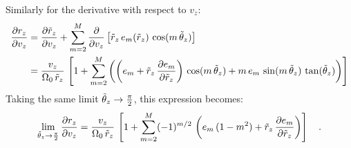 Similarly for the derivative with respect to $v_z$:
\begin{align}
    \frac{\partial r_z}{\partial v_z} &=
        \frac{\partial \tilde{r}_z}{\partial v_z} +
        \sum_{m=2}^{M} \frac{\partial}{\partial v_z}
            \left[\tilde{r}_z \, e_m(\tilde{r}_z) \, \cos(m \, \tilde{\theta}_z)\right]\\
    &= \frac{v_z}{\Omega_0 \, \tilde{r}_z} \, \left[
        1 + \sum_{m=2}^{M} \left(
            \left(e_m + \tilde{r}_z \, \frac{\partial e_m}{\partial \tilde{r}_z}\right) \,
                \cos(m \, \tilde{\theta}_z) +
            m \, e_m \, \sin(m \, \tilde{\theta}_z) \, \tan(\tilde{\theta}_z)
        \right)
    \right]
\end{align}
Taking the same limit $\tilde{\theta}_z \to \frac{\pi}{2}$, this expression becomes:
\begin{equation}
    \lim_{\tilde{\theta}_z \to \frac{\pi}{2}} \frac{\partial r_z}{\partial v_z} =
        \frac{v_z}{\Omega_0 \, \tilde{r}_z} \, \left[
            1 + \sum_{m=2}^{M} (-1)^{m/2} \,
                \left(e_m\,(1 - m^2) + \tilde{r}_z \, \frac{\partial e_m}{\partial \tilde{r}_z}\right)
        \right] \quad .
\end{equation}

